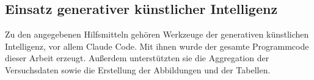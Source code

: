 \subsection*{Einsatz generativer künstlicher Intelligenz}

Zu den angegebenen Hilfsmitteln gehören Werkzeuge der generativen künstlichen Intelligenz, vor allem Claude Code. Mit ihnen wurde der gesamte Programmcode dieser Arbeit erzeugt. Außerdem unterstützten sie die Aggregation der Versuchsdaten sowie die Erstellung der Abbildungen und der Tabellen.

